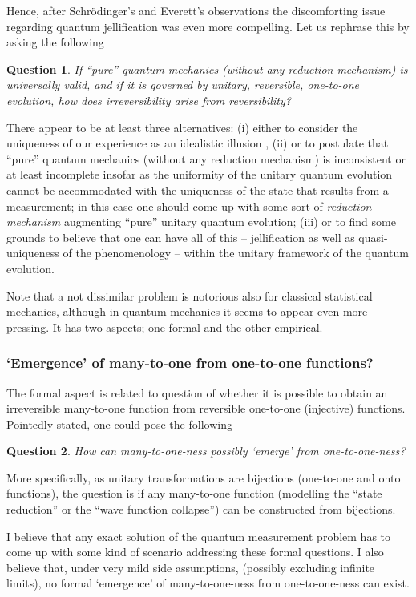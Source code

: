\documentclass[%
  preprint,
 showpacs,
 showkeys,
 preprintnumbers,
 amsmath,amssymb,
 aps,
   pra,
  longbibliography,
 ]{revtex4-1}
\newtheorem{question}{Question}
\begin{document}
Hence, after Schr\"odinger's and Everett's observations
the discomforting issue regarding quantum jellification was even more compelling.
Let us rephrase this by asking the following
{\color{blue} \begin{question}
{If ``pure'' quantum mechanics  (without any reduction mechanism) is universally valid, and if it is governed by unitary, reversible, one-to-one evolution,
how does irreversibility arise from reversibility?}
\end{question}   }
There appear to be at least three alternatives:
(i)
either to consider
the uniqueness of our experience as an idealistic illusion \cite{stace1},
(ii)
or to postulate
that ``pure'' quantum mechanics (without any reduction mechanism) is inconsistent or at least incomplete
insofar as the uniformity of the unitary quantum evolution
cannot be accommodated with the uniqueness of the state that results from a measurement;
in this case one should come up with some sort of {\em reduction mechanism} augmenting ``pure'' unitary quantum evolution;
(iii)
or to find some grounds to believe that one can have all of this
-- jellification as well as quasi-uniqueness of the phenomenology --
within the unitary framework of the quantum evolution.

Note that a not dissimilar problem is notorious also for classical statistical mechanics, although in quantum mechanics it seems
to appear even more pressing.
It has two aspects; one formal and the other empirical.

\subsubsection{`Emergence' of many-to-one from one-to-one functions?}

The formal aspect is related to question of whether it is possible to obtain an irreversible many-to-one function
from reversible one-to-one (injective) functions.
Pointedly stated, one could pose the following
{\color{blue} \begin{question}
 How can many-to-one-ness possibly `emerge' from one-to-one-ness?
\end{question}   }

More specifically, as unitary transformations are bijections (one-to-one and onto functions),
the question is if any many-to-one function (modelling the ``state reduction''
or the ``wave function collapse'')  can be constructed from bijections.

I believe that any exact solution of the quantum measurement problem has
to come up with some kind of scenario addressing these formal questions.
I also believe that, under very mild side assumptions,
(possibly excluding infinite limits),
no formal `emergence' of many-to-one-ness  from one-to-one-ness can exist.
\end{document}
